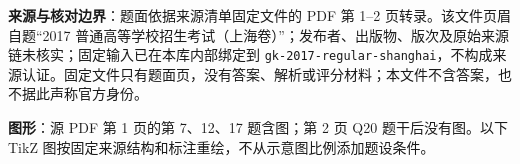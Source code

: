 

\begin{gktip}
\textbf{来源与核对边界}：题面依据来源清单固定文件的 PDF 第 1–2 页转录。该文件页眉自题“2017 普通高等学校招生考试（上海卷）”；发布者、出版物、版次及原始来源链未核实；固定输入已在本库内部绑定到 \texttt{gk-2017-regular-shanghai}，不构成来源认证。固定文件只有题面页，没有答案、解析或评分材料；本文件不含答案，也不据此声称官方身份。

\textbf{图形}：源 PDF 第 1 页的第 7、12、17 题含图；第 2 页 Q20 题干后没有图。以下 TikZ 图按固定来源结构和标注重绘，不从示意图比例添加题设条件。
\end{gktip}


